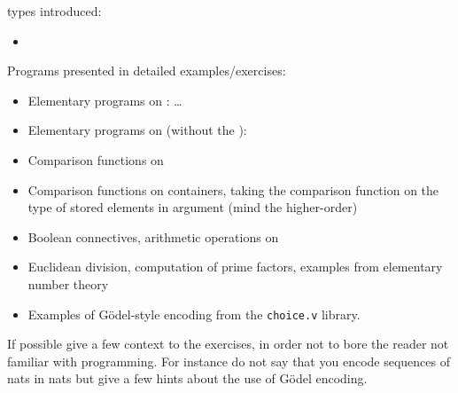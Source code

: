 \Coq{} types introduced:
\begin{itemize}
\item {}
\end{itemize}

Programs presented in detailed examples/exercises:
\begin{itemize}
\item Elementary programs on : \dots
\item Elementary programs on  (without the ):
\item Comparison functions on 
\item Comparison functions on containers, taking the comparison
  function on the type of stored elements in argument (mind the
  higher-order)
\item Boolean connectives, arithmetic operations on 
\item Euclidean division, computation of prime factors, examples from
  elementary number theory
\item Examples of G{\"o}del-style encoding from the {\tt choice.v} library.
\end{itemize}
If possible give a few context to the exercises, in order not to bore
the reader not familiar with programming. For instance do not say that
you encode sequences of nats in nats but give a few hints about the
use of G{\"o}del encoding.

